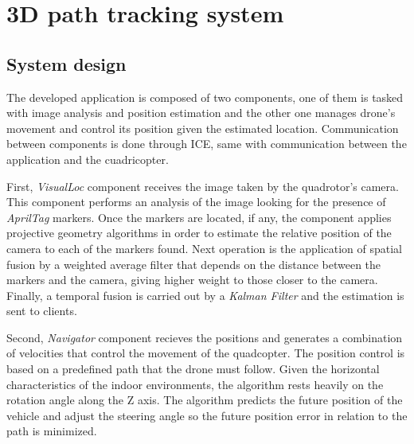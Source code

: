 \documentclass{styles/svproc}
\begin{document}
\section{3D path tracking system}

\subsection{System design}

The developed application is composed of two components, one of them is tasked with image analysis and position estimation and the other one manages drone's movement and control its position given the estimated location. Communication between components is done through ICE, same with communication between the application and the cuadricopter.
	
	First, \textit{VisualLoc} component receives the image taken by the quadrotor's camera. This component performs an analysis of the image looking for the presence of \textit{AprilTag} markers. Once the markers are located, if any, the component applies projective geometry algorithms in order to estimate the relative position of the camera to each of the markers found. Next operation is the application of spatial fusion by a weighted average filter that depends on the distance between the markers and the camera, giving higher weight to those closer to the camera. Finally, a temporal fusion is carried out by a \textit{Kalman Filter} and the estimation is sent to clients.

        Second, \textit{Navigator} component recieves the positions and generates a combination of velocities that control the movement of the quadcopter. The position control is based on a predefined path that the drone must follow. Given the horizontal characteristics of the indoor environments, the algorithm rests heavily on the rotation angle along the Z axis. The algorithm predicts the future position of the vehicle and adjust the steering angle so the future position error in relation to the path is minimized.
\end{document}
